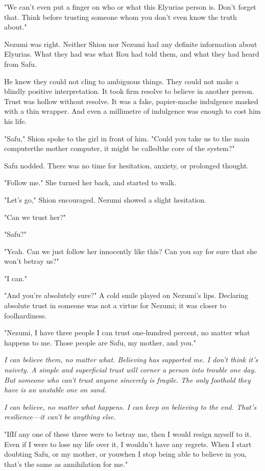 "We can't even put a finger on who or what this Elyurias person is.
Don't forget that. Think before trusting someone whom you don't even
know the truth about."

Nezumi was right. Neither Shion nor Nezumi had any definite information
about Elyurias. What they had was what Rou had told them, and what they
had heard from Safu.

He knew they could not cling to ambiguous things. They could not make a
blindly positive interpretation. It took firm resolve to believe in
another person. Trust was hollow without resolve. It was a fake,
papier-mache indulgence masked with a thin wrapper. And even a
millimetre of indulgence was enough to cost him his life.

"Safu," Shion spoke to the girl in front of him. "Could you take us to
the main computer\el the mother computer, it might be called\el the core
of the system?"

Safu nodded. There was no time for hesitation, anxiety, or prolonged
thought.

"Follow me." She turned her back, and started to walk.

"Let's go," Shion encouraged. Nezumi showed a slight hesitation.

"Can we trust her?"

"Safu?"

"Yeah. Can we just follow her innocently like this? Can you say for sure
that she won't betray us?"

"I can."

"And you're absolutely sure?" A cold smile played on Nezumi's lips.
Declaring absolute trust in someone was not a virtue for Nezumi; it was
closer to foolhardiness.

"Nezumi, I have three people I can trust one-hundred percent, no matter
what happens to me. Those people are Safu, my mother, and you."

\emph{I can believe them, no matter what. Believing has supported me. I don't
think it's naivety. A simple and superficial trust will corner a person
into trouble one day. But someone who can't trust anyone sincerely is
fragile. The only foothold they have is an unstable one on sand.}

\emph{I can believe, no matter what happens. I can keep on believing to the
end. That's resilience---it can't be anything else.}

"If\el If any one of these three were to betray me, then I would resign
myself to it. Even if I were to lose my life over it, I wouldn't have
any regrets. When I start doubting Safu, or my mother, or you\el when I
stop being able to believe in you, that's the same as annihilation for
me."

